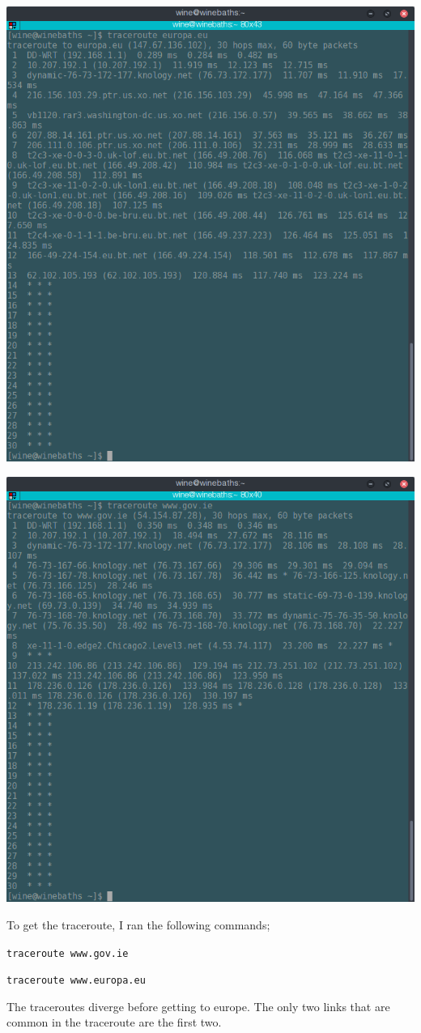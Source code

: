 \documentclass{article}
\begin{document}
\begin{enumerate}
\begin{enumerate}
\includegraphics[scale=0.5]{eu1.png}

\includegraphics[scale=0.5]{ie1.png}

To get the traceroute, I ran the following commands;

\texttt{traceroute www.gov.ie}

\texttt{traceroute www.europa.eu}

The traceroutes diverge before getting to europe. The only two links that are common in the traceroute are the first two.
\end{enumerate}
\end{enumerate}
\end{document}
